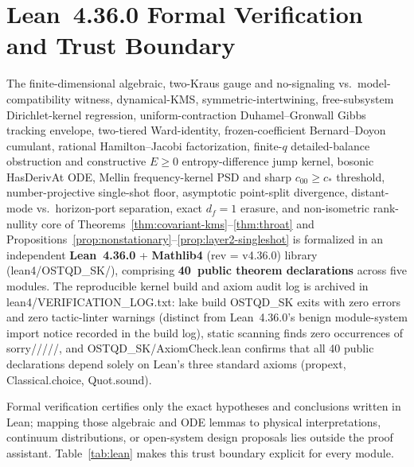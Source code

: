 \documentclass[11pt,a4paper]{article}
\theoremstyle{definition}
\theoremstyle{remark}
\newcommand{\1}{\mathbf{1}}
\newcommand{\code}[1]{{\scriptsize\ttfamily #1}}
\begin{document}
\section{Lean~4.36.0 Formal Verification and Trust Boundary}\label{sec:lean}

The finite-dimensional algebraic, two-Kraus gauge and no-signaling vs.\ model-compatibility witness, dynamical-KMS, symmetric-intertwining, free-subsystem Dirichlet-kernel regression, uniform-contraction Duhamel--Gronwall Gibbs tracking envelope, two-tiered Ward-identity, frozen-coefficient Bernard--Doyon cumulant, rational Hamilton--Jacobi factorization, finite-$q$ detailed-balance obstruction and constructive $E\ge 0$ entropy-difference jump kernel, bosonic \code{HasDerivAt} ODE, Mellin frequency-kernel PSD and sharp $c_{00}\ge c_*$ threshold, number-projective single-shot floor, asymptotic point-split divergence, distant-mode vs.\ horizon-port separation, exact $d_f=1$ erasure, and non-isometric rank-nullity core of Theorems~\ref{thm:covariant-kms}--\ref{thm:throat} and Propositions~\ref{prop:nonstationary}--\ref{prop:layer2-singleshot} is formalized in an independent \textbf{Lean~4.36.0} + \textbf{Mathlib4} (\code{rev = v4.36.0}) library (\code{lean4/\allowbreak OSTQD\_\allowbreak SK/}), comprising \textbf{40~public theorem declarations} across five modules. The reproducible kernel build and axiom audit log is archived in \code{lean4/\allowbreak VERIFICATION\_\allowbreak LOG.txt}: \code{lake build OSTQD\_\allowbreak SK} exits with zero errors and zero tactic-linter warnings (distinct from Lean~4.36.0's benign \code{module}-system import notice recorded in the build log), static scanning finds zero occurrences of \code{sorry}/\allowbreak\code{admit}/\allowbreak\code{axiom}/\allowbreak\code{constant}/\allowbreak\code{unsafe}/\allowbreak\code{sorryAx}, and \code{OSTQD\_\allowbreak SK/\allowbreak AxiomCheck.lean} confirms that all 40 public declarations depend solely on Lean's three standard axioms (\code{propext}, \code{Classical.choice}, \code{Quot.sound}).

Formal verification certifies only the exact hypotheses and conclusions written in Lean; mapping those algebraic and ODE lemmas to physical interpretations, continuum distributions, or open-system design proposals lies outside the proof assistant. Table~\ref{tab:lean} makes this trust boundary explicit for every module.
\end{document}
